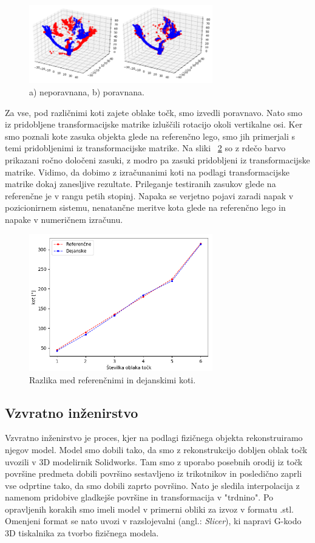 \documentclass[journal,a4paper,twoside]{sty/IEEEtran}
\begin{document}
\begin{figure}[H]
	\centerline{\includegraphics[width=8cm]{fig/poravnava}}
	\caption{a) neporavnana, b) poravnana.}
	\label{fig:poravnava}
\end{figure}
%
Za vse, pod različnimi koti zajete oblake točk, smo izvedli poravnavo. Nato smo iz pridobljene transformacijske matrike izluščili rotacijo okoli vertikalne osi. Ker smo poznali kote zasuka objekta glede na referenčno lego, smo jih primerjali s temi pridobljenimi iz transformacijske matrike. Na sliki ~\ref{fig:poravnava_graf} so z rdečo barvo prikazani ročno določeni zasuki, z modro pa zasuki pridobljeni iz transformacijske matrike. Vidimo, da dobimo z izračunanimi koti na podlagi transformacijske matrike dokaj zanesljive rezultate. Prileganje testiranih zasukov glede na referenčne je v rangu petih stopinj. Napaka se verjetno pojavi zaradi napak v pozicionirnem sistemu, nenatančne meritve kota glede na referenčno lego in napake v numeričnem izračunu.

\begin{figure}[H]
	\centerline{\includegraphics[width=8cm]{fig/graf_poravnave}}
	\caption{Razlika med referenčnimi in dejanskimi koti.}
	\label{fig:poravnava_graf}
\end{figure}

\subsection{Vzvratno inženirstvo}

Vzvratno inženirstvo je proces, kjer na podlagi fizičnega objekta rekonstruiramo njegov model. Model smo dobili tako, da smo z rekonstrukcijo dobljen oblak točk uvozili v 3D modelirnik Solidworks. Tam smo z uporabo posebnih orodij iz točk površine predmeta dobili površino sestavljeno iz trikotnikov in posledično zaprli vse odprtine tako, da smo dobili zaprto površino. Nato je sledila interpolacija z namenom pridobive gladkejše površine in transformacija v "trdnino". Po opravljenih korakih smo imeli model v primerni obliki za izvoz v formatu .stl. Omenjeni format se nato uvozi v razslojevalni (angl.: \textit{Slicer}), ki napravi G-kodo 3D tiskalnika za tvorbo fizičnega modela.
\end{document}
